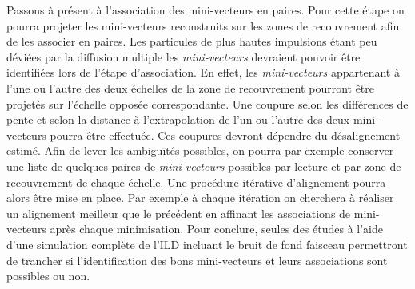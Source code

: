    \medskip

   Passons \`a pr\'esent \`a l'association des mini-vecteurs en paires. Pour cette \'etape on pourra projeter les mini-vecteurs reconstruits sur les zones de recouvrement afin de les associer en paires. Les particules de plus hautes impulsions \'etant peu d\'evi\'ees par la diffusion multiple les \textit{mini-vecteurs} devraient pouvoir \^etre identifi\'ees lors de l'\'etape d'association. En effet, les \textit{mini-vecteurs} appartenant \`a l'une ou l'autre des deux \'echelles de la zone de recouvrement pourront \^etre projet\'es sur l'\'echelle oppos\'ee correspondante. Une coupure selon les diff\'erences de pente et selon la distance \`a l'extrapolation de l'un ou l'autre des deux mini-vecteurs pourra \^etre effectu\'ee. Ces coupures devront d\'ependre du d\'esalignement estim\'e. Afin de lever les ambigu\"ités possibles, on pourra par exemple conserver une liste de quelques paires de \textit{mini-vecteurs} possibles par lecture et par zone de recouvrement de chaque \'echelle. Une proc\'edure it\'erative d'alignement pourra alors \^etre mise en place. Par exemple \`a chaque it\'eration on cherchera \`a r\'ealiser un alignement meilleur que le pr\'ec\'edent en affinant les associations de mini-vecteurs apr\`es chaque minimisation. Pour conclure, seules des \'etudes \`a l'aide d'une simulation compl\`ete de l'ILD incluant le bruit de fond faisceau permettront de trancher si l'identification des bons mini-vecteurs et leurs associations sont possibles ou non.
   
   

